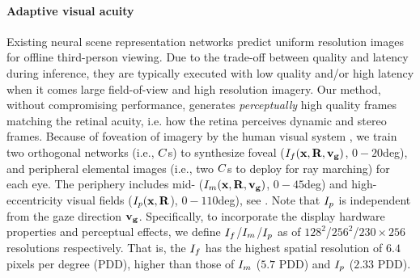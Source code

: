 \paragraph{Adaptive visual acuity} 
Existing neural scene representation networks predict uniform resolution images for offline third-person viewing.
Due to the trade-off between quality and latency during inference, they are typically executed with low quality and/or high latency when it comes large field-of-view and high resolution imagery.  
Our method, without compromising performance, generates {\it perceptually} high quality frames matching the retinal acuity, i.e. how the retina perceives dynamic and stereo frames.
Because of foveation of imagery by the human visual system \cite{Guenter:2012:F3G}, we train two orthogonal networks (i.e., $C$s) to synthesize foveal ($I_{f}(\mathbf{x},\mathbf{R},\mathbf{\mathbf{v}_g})$, $0-20$deg), and peripheral elemental images (i.e., two $C$s to deploy for ray marching) for each eye.
The periphery includes mid- ($I_{m}(\mathbf{x},\mathbf{R},\mathbf{\mathbf{v}_g})$, $0-45$deg) and high- eccentricity visual fields ($I_{p}(\mathbf{x},\mathbf{R}$), $0-110$deg), see .
Note that $I_{p}$ is independent from the gaze direction $\mathbf{\mathbf{v}_g}$. 
 Specifically, to incorporate the display hardware properties and perceptual effects, we define $I_{f}$/$I_{m}$/$I_{p}$ as of $128^2$/$256^2$/$230\times256$ resolutions respectively.
That is, the $I_{f}$ has the highest spatial resolution of $6.4$ pixels per degree (PDD), higher than those of $I_{m}$ ($5.7$ PDD) and $I_{p}$ ($2.33$ PDD).

